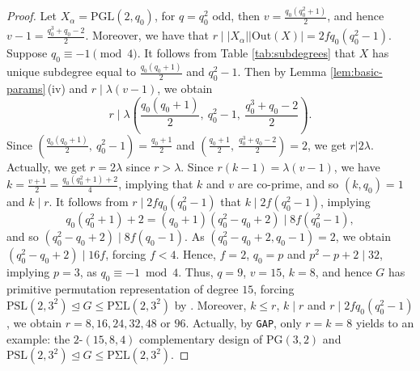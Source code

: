 \documentclass[a4paper,twopage,reqno,12pt]{amsart}
\theoremstyle{definition}
\numberwithin{equation}{section}
\newcommand{\PSL}{\mathrm{PSL}}
\newcommand{\PGL}{\mathrm{PGL}}
\newcommand{\PGaL}{\mathrm{P\Gamma L}}
\newcommand{\PSigL}{\mathrm{P\Sigma L}}
\newcommand{\Out}{\mathrm{Out}}
\newcommand{\PG}{\mathrm{PG}}
\renewcommand{\leq}{\leqslant}
\begin{document}
\begin{proof}
Let $X_{\alpha}=\mathrm{PGL}(2,q_0)$, for $q=q_0^2$ odd, then $v=\frac{q_0(q_0^2+1)}{2}$, and hence $v-1=\frac{q_0^3+q_0-2}{2}$.
Moreover, we have that $r\mid |X_{\alpha}||\Out(X)|=2fq_0(q_0^2-1)$.
\\
Suppose $q_0\equiv -1 \pmod{4}$. It follows from Table \ref{tab:subdegrees} that $X$ has unique subdegree equal to
$\frac{q_0(q_0+1)}{2}$ and $q_0^2-1$.
Then by Lemma \ref{lem:basic-params}\,(iv) and $r\mid \lambda (v-1)$, we obtain 
\[
r\mid \lambda\left(\frac{q_0(q_0+1)}{2}, \ q_0^2-1, \ \frac{q_0^3+q_0-2}{2} \right).
\]
Since $\left(\frac{q_0(q_0+1)}{2}, \ q_0^2-1\right)=\frac{q_0+1}{2}$ and $\left(\frac{q_0+1}{2}, \ \frac{q_0^3+q_0-2}{2}\right)=2$, we get $r|2\lambda$. Actually, we get $r=2\lambda$ since $r>\lambda$.
Since $r(k-1)=\lambda(v-1)$, we have $k=\frac{v+1}{2}=\frac{q_0(q_0^2+1)+2}{4}$, implying that $k$ and $v$ are co-prime,
and so $(k,q_0)=1$ and $k\mid r$.
It follows from $r\mid 2fq_0(q_0^2-1)$ that $k\mid 2f(q_0^2-1)$, implying
\[
q_0(q_0^2+1)+2=(q_0+1)(q_0^2-q_0+2)\mid 8f(q_0^2-1),
\]
and so $(q_0^2-q_0+2)\mid 8f(q_0-1)$.
As $(q_0^2-q_0+2,q_0-1)=2$, we obtain $(q_0^2-q_0+2) \mid 16f$, forcing $f<4$.
Hence, $f=2$, $q_0=p$ and $p^2-p+2\mid 32$, 
implying $p=3$, as $q_0\equiv-1\bmod 4$. 
Thus, $q=9$, $v=15$, $k=8$, and hence $G$ has primitive permutation representation of degree $15$, forcing $\PSL(2,3^{2})\unlhd G \leq \PSigL(2,3^{2})$ by \cite{At}. Moreover, $k\le r$, $k\mid r$ and $r\mid 2fq_0(q_0^2-1)$,
we obtain $r=8, 16, 24, 32, 48$ or $96$. Actually, by \texttt{GAP}, only $r=k=8$ yields to an example: the $2$-$(15,8,4)$ complementary design of $\PG(3,2)$ and $\PSL(2,3^{2})\unlhd G \leq \PSigL(2,3^{2})$. 

\end{proof}
\end{document}
